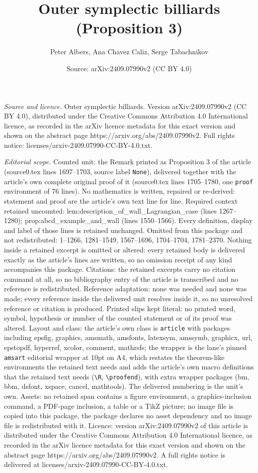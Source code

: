 \documentclass[10pt,a4paper]{amsart}
\title[Outer symplectic billiards]{Outer symplectic billiards (Proposition 3)}
\author{Peter Albers, Ana Chavez Caliz, Serge Tabachnikov}
\date{Source: arXiv:2409.07990v2 (CC BY 4.0)}
\begin{document}
\maketitle

\noindent\emph{Source and licence.} Outer symplectic billiards. Version arXiv:2409.07990v2 (CC BY 4.0), distributed under the Creative Commons Attribution 4.0 International licence, as recorded in the arXiv licence metadata for this exact version and shown on the abstract page https://arxiv.org/abs/2409.07990v2. Full rights notice: licenses/arxiv-2409.07990-CC-BY-4.0.txt.\par\smallskip

\noindent\textit{Editorial scope.} Counted unit: the Remark printed as Proposition 3 of the article (source0.tex lines 1697--1703, source label \texttt{None}), delivered together with the article's own complete original proof of it (source0.tex lines 1705--1780, one \texttt{proof} environment of 76 lines). No mathematics is written, repaired or re-derived: statement and proof are the article's own text line for line. Required context retained uncounted: lem:description\_of\_wall\_Lagrangian\_case (lines 1267--1280); prop:abcd\_example\_and\_wall (lines 1550--1566). Every definition, display and label of those lines is retained unchanged. Omitted from this package and not redistributed: 1--1266, 1281--1549, 1567--1696, 1704--1704, 1781--2370. Nothing inside a retained excerpt is omitted or altered: every retained body is delivered exactly as the article's lines are written, so no omission receipt of any kind accompanies this package. Citations: the retained excerpts carry no citation command at all, so no bibliography entry of the article is transcribed and no reference is redistributed. Reference adaptation: none was needed and none was made; every reference inside the delivered unit resolves inside it, so no unresolved reference or citation is produced. Printed slips kept literal: no printed word, symbol, hypothesis or number of the counted statement or of its proof was altered. Layout and class: the article's own class is \texttt{article} with packages including epsfig, graphics, amsmath, amsfonts, latexsym, amssymb, graphicx, url, epstopdf, hyperref, xcolor, comment, mathrsfs; the wrapper is the lane's pinned \texttt{amsart} editorial wrapper at 10pt on A4, which restates the theorem-like environments the retained text needs and adds the article's own macro definitions that the retained text needs (\texttt{\textbackslash R}, \texttt{\textbackslash proofend}), with extra wrapper packages (bm, bbm, dsfont, xspace, cancel, mathtools). The delivered numbering is the unit's own. Assets: no retained span contains a figure environment, a graphics-inclusion command, a PDF-page inclusion, a table or a TikZ picture; no image file is copied into this package, the package declares no asset dependency and no image file is redistributed with it. Licence: version arXiv:2409.07990v2 of this article is distributed under the Creative Commons Attribution 4.0 International licence, as recorded in the arXiv licence metadata for this exact version and shown on the abstract page https://arxiv.org/abs/2409.07990v2. A full rights notice is delivered at licenses/arxiv-2409.07990-CC-BY-4.0.txt. 
\end{document}
